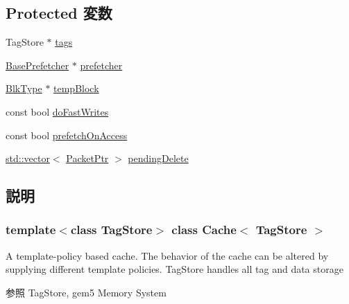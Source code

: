 \subsection*{Protected 変数}
\begin{DoxyCompactItemize}
\item 
TagStore $\ast$ \hyperlink{classCache_adb086ae267638f3864a6b3199f1d01e9}{tags}
\item 
\hyperlink{classBasePrefetcher}{BasePrefetcher} $\ast$ \hyperlink{classCache_a320f5a2352104b9b633113f9045461a3}{prefetcher}
\item 
\hyperlink{classCache_a10db52a1c10bfd238e0e3d37c4560495}{BlkType} $\ast$ \hyperlink{classCache_a0ca2086b66114357dd17032178adce17}{tempBlock}
\item 
const bool \hyperlink{classCache_a9b589ab6323a2796b7ae762dc7236bb5}{doFastWrites}
\item 
const bool \hyperlink{classCache_a146f074bf7af4a70fc378862eab0b15a}{prefetchOnAccess}
\item 
\hyperlink{classstd_1_1vector}{std::vector}$<$ \hyperlink{classPacket}{PacketPtr} $>$ \hyperlink{classCache_a21da4bea3554874b557428e4cce5d4a4}{pendingDelete}
\end{DoxyCompactItemize}


\subsection{説明}
\subsubsection*{template$<$class TagStore$>$ class Cache$<$ TagStore $>$}

A template-\/policy based cache. The behavior of the cache can be altered by supplying different template policies. TagStore handles all tag and data storage \begin{DoxySeeAlso}{参照}
TagStore, gem5 Memory System 
\end{DoxySeeAlso}


